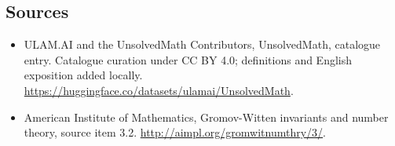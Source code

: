 \documentclass[11pt]{article}
\begin{document}
\subsection{Sources}
\begin{itemize}
\item[\hypertarget{source:statement:1}{S1}] ULAM.AI and the UnsolvedMath Contributors, UnsolvedMath, catalogue entry. Catalogue curation under CC BY 4.0; definitions and English exposition added locally.
\url{https://huggingface.co/datasets/ulamai/UnsolvedMath}.
\item[\hypertarget{source:statement:2}{S2}] American Institute of Mathematics, Gromov-Witten invariants and number theory, source item 3.2.
\url{http://aimpl.org/gromwitnumthry/3/}.
\end{itemize}
\label{end:statement}
\end{document}
